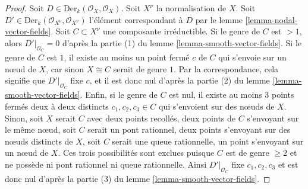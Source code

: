 \begin{proof}
Soit $D \in \text{Der}_k(\mathcal{O}_X, \mathcal{O}_X)$. Soit $X^\nu$ la normalisation de $X$. Soit $D' \in \text{Der}_k(\mathcal{O}_{X^\nu}, \mathcal{O}_{X^\nu})$ l'élément correspondant à $D$ par le lemme \ref{lemma-nodal-vector-fields}. Soit $C \subset X^\nu$ une composante irréductible. Si le genre de $C$ est $> 1$, alors $D'|_{\mathcal{O}_C} = 0$ d'après la partie (1) du lemme \ref{lemma-smooth-vector-fields}. Si le genre de $C$ est $1$, il existe au moins un point fermé $c$ de $C$ qui s'envoie sur un nœud de $X$, car sinon $X \cong C$ serait de genre $1$. Par la correspondance, cela signifie que $D'|_{\mathcal{O}_C}$ fixe $c$, et il est donc nul d'après la partie (2) du lemme \ref{lemma-smooth-vector-fields}. Enfin, si le genre de $C$ est nul, il existe au moins $3$ points fermés deux à deux distincts $c_1, c_2, c_3 \in C$ qui s'envoient sur des nœuds de $X$. Sinon, soit $X$ serait $C$ avec deux points recollés, deux points de $C$ s'envoyant sur le même nœud, soit $C$ serait un pont rationnel, deux points s'envoyant sur des nœuds distincts de $X$, soit $C$ serait une queue rationnelle, un point s'envoyant sur un nœud de $X$. Ces trois possibilités sont exclues puisque $C$ est de genre $\geq 2$ et ne possède ni pont rationnel ni queue rationnelle. Ainsi $D'|_{\mathcal{O}_C}$ fixe $c_1, c_2, c_3$ et est donc nul d'après la partie (3) du lemme \ref{lemma-smooth-vector-fields}.
\end{proof}











